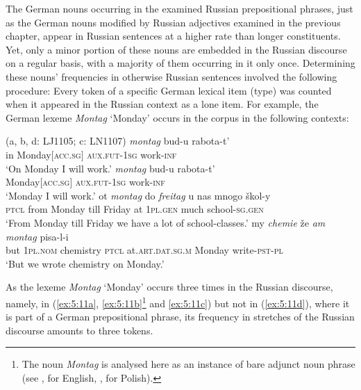 The German nouns occurring in the examined Russian prepositional phrases, just as the German nouns modified by Russian adjectives examined in the previous chapter, appear in Russian sentences at a higher rate than longer constituents. Yet, only a minor portion of these nouns are embedded in the Russian discourse on a regular basis, with a majority of them occurring in it only once. Determining these nouns’ frequencies in otherwise Russian sentences involved the following procedure: Every token of a specific German lexical item (type) was counted when it appeared in the Russian context as a lone item. For example, the German lexeme \textit{Montag} `Monday' occurs in the corpus in the following contexts:

\ea
\label{ex:5:11}
(a, b, d: LJ1105; c: LN1107)
	\ea 
	 \textit{montag} {bud-u} {rabota-t'}\\
		{in} Monday\([\)\textsc{acc.sg}\(]\) \textsc{aux.fut-1sg} work-\textsc{inf}\\
			\glt `On Monday I will work.'\label{ex:5:11a}
		\ex
		\gll \textit{montag} {bud-u} {rabota-t'}\\
			{Monday\([\)\textsc{acc.sg}\(]\)} \textsc{aux.fut-1sg} work-\textsc{inf}\\
			\glt `Monday I will work.'\label{ex:5:11b}
		\ex
		 {ot} \textit{montag} {do} \textit{freitag} {u} {nas} {mnogo} {škol-y}\\
			{\textsc{ptcl}} from Monday till Friday at \textsc{1pl.gen} much school-\textsc{sg.gen}\\
			\glt `From Monday till Friday we have a lot of school-classes.'\label{ex:5:11c}
		\ex
		 {my} \textit{chemie} {že} \textit{am} \textit{montag} {pisa-l-i}\\
			{but} \textsc{1pl.nom} chemistry \textsc{ptcl} at.\textsc{art.dat.sg.m} Monday write-\textsc{pst-pl}\\ 
			\glt `But we wrote chemistry on Monday.'		\label{ex:5:11d}
		\z
\z

\noindent 
As the lexeme \textit{Montag} `Monday' occurs three times in the Russian discourse, namely, in (\ref{ex:5:11a}, \ref{ex:5:11b}\footnote{
	The noun \textit{Montag} is analysed here as an instance of bare adjunct noun phrase (see \citealt{larson85}, for English, \citealt{tajsner}, for Polish).} 
and \ref{ex:5:11c}) but not in (\ref{ex:5:11d}), where it is part of a German prepositional phrase, its frequency in stretches of the Russian discourse amounts to three tokens.

